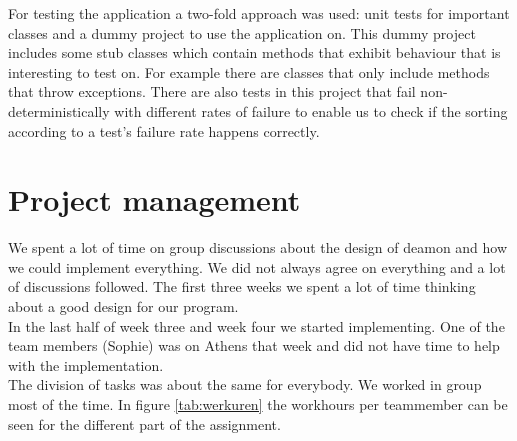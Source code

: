 \documentclass[i2]{oss}
\begin{document}
For testing the application a two-fold approach was used: unit tests for
important classes and a dummy project to use the application on.
This dummy project includes some stub classes which contain methods that
exhibit behaviour that is interesting to test on.
For example there are classes that only include methods that throw 
exceptions.
There are also tests in this project that fail non-deterministically with 
different rates of failure to enable us to check if the sorting according 
to a test's failure rate happens correctly.



\section{Project management}
\label{ssec:Projectmanag}

We spent a lot of time on group discussions about the design of deamon and how we could implement everything. We did not always agree on everything and a lot of discussions followed. The first three weeks we spent a lot of time thinking about a good design for our program.\\ 

In the last half of week three and week four we started  implementing. One of the team members (Sophie) was on Athens that week and did not have time to help with the implementation. \\

The division of tasks was about the same for everybody. We worked in group most of the time. In figure \ref{tab:werkuren} the workhours per teammember can be seen for the different part of the assignment.
\end{document}
